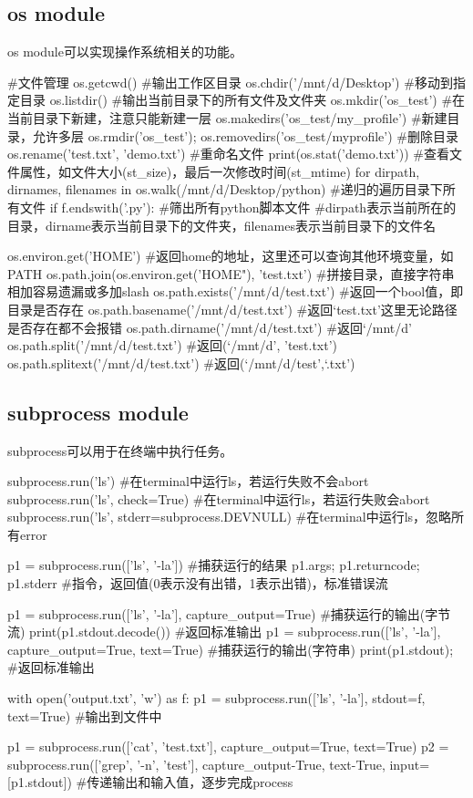   \subsection{os module}
    os module可以实现操作系统相关的功能。
    \begin{codeblock}[language=python, caption={os module}]
      #文件管理
      os.getcwd() #输出工作区目录
      os.chdir('/mnt/d/Desktop') #移动到指定目录
      os.listdir() #输出当前目录下的所有文件及文件夹
      os.mkdir('os_test') #在当前目录下新建，注意只能新建一层
      os.makedirs('os_test/my_profile') #新建目录，允许多层
      os.rmdir('os_test'); os.removedirs('os_test/myprofile') #删除目录
      os.rename('test.txt', 'demo.txt') #重命名文件
      print(os.stat('demo.txt')) #查看文件属性，如文件大小(st\_size)，最后一次修改时间(st\_mtime)
      for dirpath, dirnames, filenames in os.walk(/mnt/d/Desktop/python) #递归的遍历目录下所有文件
          if f.endswith('.py'): #筛出所有python脚本文件
      #dirpath表示当前所在的目录，dirname表示当前目录下的文件夹，filenames表示当前目录下的文件名

      os.environ.get('HOME') #返回home的地址，这里还可以查询其他环境变量，如PATH
      os.path.join(os.environ.get('HOME"), 'test.txt') #拼接目录，直接字符串相加容易遗漏或多加slash
      os.path.exists('/mnt/d/test.txt') #返回一个bool值，即目录是否存在
      os.path.basename('/mnt/d/test.txt') #返回`test.txt'这里无论路径是否存在都不会报错
      os.path.dirname('/mnt/d/test.txt') #返回`/mnt/d'
      os.path.split('/mnt/d/test.txt') #返回(`/mnt/d', 'test.txt')
      os.path.splitext('/mnt/d/test.txt') #返回(`/mnt/d/test',`.txt')
    \end{codeblock}

  \subsection{subprocess module}
    subprocess可以用于在终端中执行任务。
    \begin{codeblock}[language=python, caption={subprocess module}]
      subprocess.run('ls') #在terminal中运行ls，若运行失败不会abort
      subprocess.run('ls', check=True) #在terminal中运行ls，若运行失败会abort
      subprocess.run('ls', stderr=subprocess.DEVNULL) #在terminal中运行ls，忽略所有error

      p1 = subprocess.run(['ls', '-la']) #捕获运行的结果
      p1.args; p1.returncode; p1.stderr #指令，返回值(0表示没有出错，1表示出错)，标准错误流

      p1 = subprocess.run(['ls', '-la'], capture_output=True) #捕获运行的输出(字节流)
      print(p1.stdout.decode()) #返回标准输出
      p1 = subprocess.run(['ls', '-la'], capture_output=True, text=True) #捕获运行的输出(字符串)
      print(p1.stdout); #返回标准输出

      with open('output.txt', 'w') as f:
          p1 = subprocess.run(['ls', '-la'], stdout=f, text=True) #输出到文件中

      p1 = subprocess.run(['cat', 'test.txt'], capture_output=True, text=True)
      p2 = subprocess.run(['grep', '-n', 'test'], capture_output-True, text-True, input=[p1.stdout])
      #传递输出和输入值，逐步完成process
    \end{codeblock}

